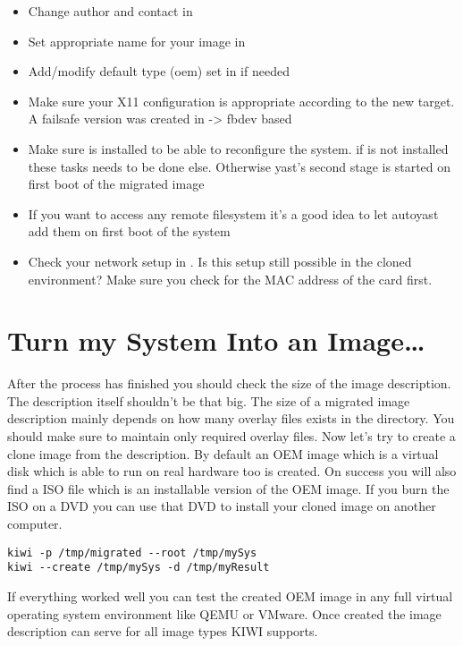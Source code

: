 \begin{itemize}
\item Change author and contact in 
\item Set appropriate name for your image in 
\item Add/modify default type (oem) set in  if needed
\item Make sure your X11 configuration is appropriate according to
      the new target. A failsafe version was created in
       -> fbdev based
\item Make sure  is installed to be able to reconfigure
      the system. if  is not installed these tasks needs to
      be done else. Otherwise yast's second stage is started on first
      boot of the migrated image
\item If you want to access any remote filesystem it's a good
      idea to let autoyast add them on first boot of the system
\item Check your network setup in . Is this
      setup still possible in the cloned environment? Make sure you
      check for the MAC address of the card first.
\end{itemize}

\section{Turn my System Into an Image\ldots}
After the process has finished you should check the size of the
image description. The description itself shouldn't be that big.
The size of a migrated image description mainly depends on how many
overlay files exists in the  directory. You should make
sure to maintain only required overlay files. Now let's try to create a
clone image from the description. By default an OEM image which is
a virtual disk which is able to run on real hardware too is created.
On success you will also find a ISO file which is an installable
version of the OEM image. If you burn the ISO on a DVD you can use
that DVD to install your cloned image on another computer.

\begin{Command}{14cm}
\begin{verbatim}
kiwi -p /tmp/migrated --root /tmp/mySys
kiwi --create /tmp/mySys -d /tmp/myResult
\end{verbatim}
\end{Command}

If everything worked well you can test the created OEM
image in any full virtual operating system environment like QEMU or
VMware. Once created the image description can serve for all image
types KIWI supports.
 
